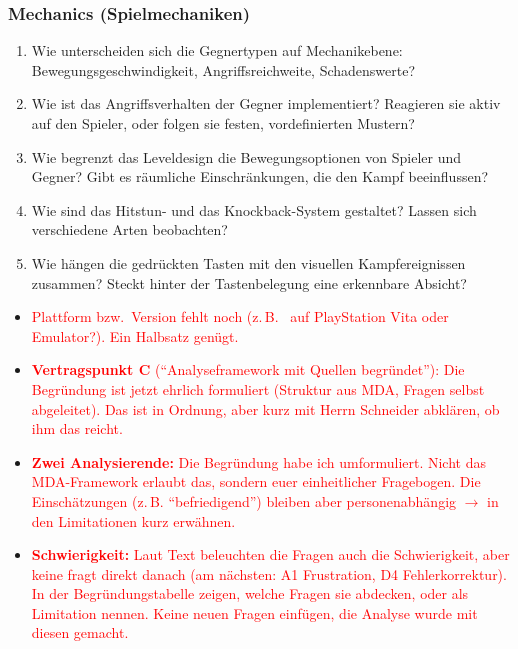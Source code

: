 \documentclass[../Main.tex]{subfiles}
\begin{document}
\subsubsection{Mechanics (Spielmechaniken)}

\begin{enumerate}[label=\textbf{M\arabic*}, leftmargin=1.5cm, itemsep=0.5em]
    \item Wie unterscheiden sich die Gegnertypen auf Mechanikebene: Bewegungsgeschwindigkeit, Angriffsreichweite, Schadenswerte?
    \item Wie ist das Angriffsverhalten der Gegner implementiert? Reagieren sie aktiv auf den Spieler, oder folgen sie festen, vordefinierten Mustern?
    \item Wie begrenzt das Leveldesign die Bewegungsoptionen von Spieler und Gegner? Gibt es räumliche Einschränkungen, die den Kampf beeinflussen?
    \item Wie sind das Hitstun- und das Knockback-System gestaltet? Lassen sich verschiedene Arten beobachten?
    \item Wie hängen die gedrückten Tasten mit den visuellen Kampfereignissen zusammen? Steckt hinter der Tastenbelegung eine erkennbare Absicht?
\end{enumerate}

\begin{itemize}[leftmargin=1.5cm]
    \item \textcolor{red}{Plattform bzw.\ Version fehlt noch (z.\,B.\  auf PlayStation Vita oder Emulator?). Ein Halbsatz genügt.}
    \item \textcolor{red}{\textbf{Vertragspunkt C} (\enquote{Analyseframework mit Quellen begründet}): Die Begründung ist jetzt ehrlich formuliert (Struktur aus MDA, Fragen selbst abgeleitet). Das ist in Ordnung, aber kurz mit Herrn Schneider abklären, ob ihm das reicht.}
    \item \textcolor{red}{\textbf{Zwei Analysierende:} Die Begründung habe ich umformuliert. Nicht das MDA-Framework erlaubt das, sondern euer einheitlicher Fragebogen. Die Einschätzungen (z.\,B. \enquote{befriedigend}) bleiben aber personenabhängig $\rightarrow$ in den Limitationen kurz erwähnen.}
    \item \textcolor{red}{\textbf{Schwierigkeit:} Laut Text beleuchten die Fragen auch die Schwierigkeit, aber keine fragt direkt danach (am nächsten: A1 Frustration, D4 Fehlerkorrektur). In der Begründungstabelle zeigen, welche Fragen sie abdecken, oder als Limitation nennen. Keine neuen Fragen einfügen, die Analyse wurde mit diesen gemacht.}
\end{itemize}
\end{document}
